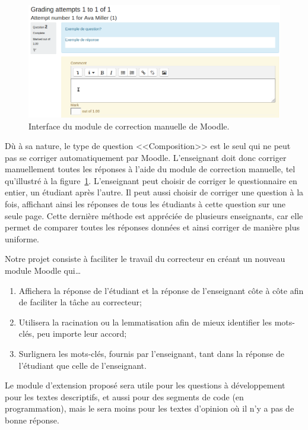 \begin{figure}[htbp]
  \includegraphics[scale=0.55]{images/correction-manuelle.png}
  \caption{Interface du module de correction manuelle de Moodle.}
  \label{correction-manuelle}
\end{figure}

D\`u \`a sa nature, le type de question <<Composition>> est le seul qui ne peut pas se corriger automatiquement par Moodle.
L'enseignant doit donc corriger manuellement toutes les r\'eponses \`a l'aide du module de correction manuelle, tel qu'illustr\'e \`a la figure~\ref{correction-manuelle}.
L'enseignant peut choisir de corriger le questionnaire en entier, un \'etudiant apr\`es l'autre.
Il peut aussi choisir de corriger une question \`a la fois, affichant ainsi les r\'eponses de tous les \'etudiants \`a cette question sur une seule page.
Cette derni\`ere m\'ethode est appr\'eci\'ee de plusieurs enseignants, car elle permet de comparer toutes les r\'eponses donn\'ees et ainsi corriger de mani\`ere plus uniforme.

Notre projet consiste \`a faciliter le travail du correcteur en cr\'eant un nouveau module Moodle qui\ldots
\begin{enumerate}
  \item Affichera la r\'eponse de l'\'etudiant et la r\'eponse de l'enseignant c\^ote \`a c\^ote afin de faciliter la t\^ache au correcteur;
  \item Utilisera la racination ou la lemmatisation afin de mieux identifier les mots-cl\'es, peu importe leur accord;
  \item Surlignera les mots-cl\'es, fournis par l'enseignant, tant dans la r\'eponse de l'\'etudiant que celle de l'enseignant.
\end{enumerate}
Le module d'extension propos\'e sera utile pour les questions \`a d\'eveloppement pour les textes descriptifs, et aussi pour des segments de code (en programmation), mais le sera moins pour les textes d'opinion o\`u il n'y a pas de \og bonne \fg{} r\'eponse.

